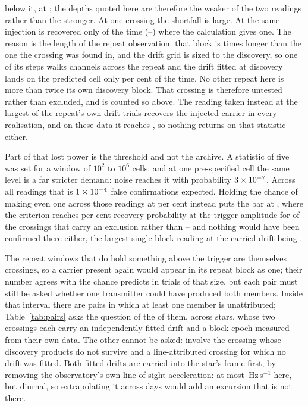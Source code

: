 below it, at \HjDevStarOther; the depths quoted here are therefore the weaker
of the two readings rather than the stronger. At one crossing the shortfall
is large. At \HjEtaStar{} the same injection is recovered only
\HjEtaMeas{} of the time (\HjEtaLo--\HjEtaHi) where the calculation gives
one. The reason is the length of the repeat observation: that block is
\HjEtaLenRatio{} times longer than the one the crossing was found in, and
the drift grid is sized to the discovery, so one of its steps walks
\HjEtaWalkCh{} channels across the repeat and the drift fitted at discovery
lands on the predicted cell only \HjEtaFracOkPct{} per cent of the time. No
other repeat here is more than twice its own discovery block. That crossing is therefore untested rather than excluded,
and is counted so above. The reading taken instead at the largest of the
repeat's own drift trials recovers the injected carrier in every realisation,
and on these data it reaches \HjEtaMaxReal, so nothing returns on that
statistic either.

Part of that lost power is the threshold and not the archive. A statistic
of five was set for a window of $10^{2}$ to $10^{6}$ cells, and at one
pre-specified cell the same level is a far stricter demand: noise reaches it with probability
$3\times10^{-7}$. Across all \RcNRepeatMeas{} readings
that is $1\times10^{-4}$ false confirmations
expected. Holding the chance of making even one across
those readings at \ZtFwPct{} per cent instead puts the bar at \ZtTrialThr,
where the criterion reaches \RcPowerLevel{} per cent recovery probability at
the trigger amplitude for \HjNPowerTrial{} of the crossings that carry an
exclusion rather than \HjNPowerHi{} -- and nothing would have been confirmed
there either, the largest single-block reading at the carried drift being
\RcTMatched.

The \WdNExc{} repeat windows that do hold something above the trigger are
themselves crossings, so a carrier present again would appear in its repeat
block as one; their number agrees with the \WdExpect{} chance predicts in
trials of that size, but each pair must still be asked whether one transmitter
could have produced both members. Inside that interval there are
\TjNCandPair{} pairs in which at least
one member is unattributed; Table~\ref{tab:pairs} asks the question of the
\TjNPair{} of them, across \TjNStarPair{} stars, whose two crossings each
carry an independently fitted drift and a block epoch measured from their own
data. The other \TjNCandLost{} cannot be asked: \TjNCandLostSpec{} involve the
crossing whose discovery products do not survive and \TjNCandLostFit{} a
line-attributed crossing for which no drift was fitted. Both fitted drifts are
carried into the star's frame first, by removing the observatory's own
line-of-sight acceleration: at most \TjFrameMaxHzS\,Hz\,s$^{-1}$ here, but
diurnal, so extrapolating it across days would add an excursion that is not
there.

